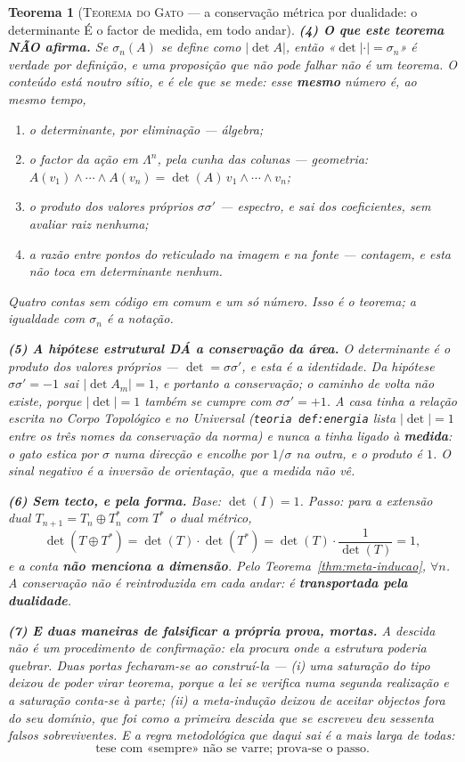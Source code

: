 \documentclass[11pt,a4paper]{article}
\newtheorem{teorema}{Teorema}
\newcommand{\code}[1]{\texttt{\small #1}}
\newcommand{\leitura}[1]{\code{#1}}
\begin{document}
\begin{teorema}[\textsc{Teorema do Gato} --- a conservação métrica por
dualidade: o determinante É o factor de medida, em todo
andar]
\textbf{(4) O que este teorema NÃO afirma.} Se $\sigma_{n}(A)$ se
\emph{define} como $|\det A|$, então «$\det|\cdot|=\sigma_{n}$» é verdade
por definição, e uma proposição que não pode falhar não é um teorema. O
conteúdo está noutro sítio, e é ele que se mede: esse \textbf{mesmo}
número é, ao mesmo tempo,
\begin{enumerate}
\item o determinante, por eliminação --- \emph{álgebra};
\item o factor da ação em $\Lambda^{n}$, pela cunha das colunas ---
\emph{geometria}: $A(v_{1})\wedge\cdots\wedge A(v_{n})=\det(A)\,
v_{1}\wedge\cdots\wedge v_{n}$;
\item o produto dos valores próprios $\sigma\sigma'$ --- \emph{espectro},
e sai dos coeficientes, sem avaliar raiz nenhuma;
\item a razão entre pontos do reticulado na imagem e na fonte ---
\emph{contagem}, e esta não toca em determinante nenhum.
\end{enumerate}
Quatro contas sem código em comum e um só número. \emph{Isso} é o
teorema; a igualdade com $\sigma_{n}$ é a notação.

\textbf{(5) A hipótese estrutural DÁ a conservação da área.} O
determinante é o produto dos valores próprios --- $\det=\sigma\sigma'$, e
\emph{esta} é a identidade. Da hipótese $\sigma\sigma'=-1$ sai
$|\det A_{m}|=1$, e portanto a conservação; o caminho de volta não
existe, porque $|\det|=1$ também se cumpre com $\sigma\sigma'=+1$. A casa tinha a relação escrita no \emph{Corpo Topológico} e no
Universal (\leitura{teoria def:energia} lista $|\det|=1$ entre os três nomes
da conservação da norma) e nunca a tinha ligado à \textbf{medida}: o
gato estica por $\sigma$ numa direcção e encolhe por $1/\sigma$ na
outra, e o produto é $1$. O sinal negativo é a inversão de orientação,
que a medida não vê.

\textbf{(6) Sem tecto, e pela forma.} Base: $\det(I)=1$. Passo: para a
extensão dual $T_{n+1}=T_{n}\oplus T_{n}^{\ast}$ com $T^{\ast}$ o dual
métrico,
\[
\det(T\oplus T^{\ast})=\det(T)\cdot\det(T^{\ast})
=\det(T)\cdot\frac{1}{\det(T)}=1,
\]
e a conta \textbf{não menciona a dimensão}. Pelo
Teorema~\ref{thm:meta-inducao}, $\forall n$. A conservação não é
reintroduzida em cada andar: é \textbf{transportada pela dualidade}.

\textbf{(7) E duas maneiras de falsificar a própria prova, mortas.} A
descida não é um procedimento de confirmação: ela procura \emph{onde a
estrutura poderia quebrar}. Duas portas fecharam-se ao construí-la ---
(i) uma \emph{saturação} do tipo deixou de poder virar teorema, porque a
lei se verifica numa segunda realização e a saturação conta-se à parte;
(ii) a meta-indução deixou de aceitar objectos \emph{fora do seu
domínio}, que foi como a primeira descida que se escreveu deu sessenta
falsos sobreviventes. E a regra metodológica que daqui sai é a mais
larga de todas:
\[
\boxed{\;\text{tese com «sempre» não se varre; prova-se o passo.}\;}
\]


\end{teorema}
\end{document}
